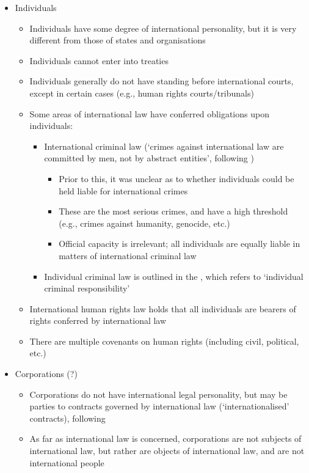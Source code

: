 \begin{itemize}
    \item Individuals
    \begin{itemize}
        \item Individuals have some degree of international personality, but it is very different from those of states and organisations
        \item Individuals cannot enter into treaties
        \item Individuals generally do not have standing before international courts, except in certain cases (e.g., human rights courts/tribunals)
        \item Some areas of international law have conferred obligations upon individuals:
        \begin{itemize}
            \item International criminal law (`crimes against international law are committed by men, not by abstract entities', following )
            \begin{itemize}
                \item Prior to this, it was unclear as to whether individuals could be held liable for international crimes
                \item These are the most serious crimes, and have a high threshold (e.g., crimes against humanity, genocide, etc.)
                \item Official capacity is irrelevant; all individuals are equally liable in matters of international criminal law
            \end{itemize}
            \item Individual criminal law is outlined in the , which refers to `individual criminal responsibility'
        \end{itemize}
        \item International human rights law holds that all individuals are bearers of rights conferred by international law
        \item There are multiple covenants on human rights (including civil, political, etc.)
    \end{itemize}
    \item Corporations (?)
    \begin{itemize}
        \item Corporations do not have international legal personality, but may be parties to contracts governed by international law (`internationalised' contracts), following 
        \item As far as international law is concerned, corporations are not subjects of international law, but rather are objects of international law, and are not international people
    \end{itemize}
\end{itemize}


